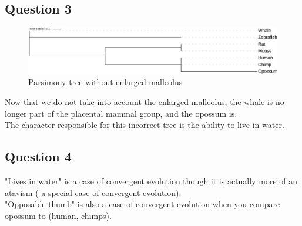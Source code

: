 \documentclass[]{article}
\theoremstyle{definition}
\begin{document}
\subsection{Question 3}
\begin{figure}[h!]
	\includegraphics*[width = \linewidth]{../ex3/PARS2.pdf}
	\caption{\label{nj2} Parsimony tree without enlarged malleolus }
\end{figure}
Now that we do not take into account the enlarged malleolus, the whale is no longer part of the placental mammal group, and the opossum is.\\
The character responsible for this incorrect tree is the ability to live in water.

\subsection{Question 4}
"Lives in water" is a case of convergent evolution though it is actually more of an atavism ( a special case of convergent evolution).\\
"Opposable thumb" is also a case of convergent evolution when you compare opossum to (human, chimps).
\end{document}
